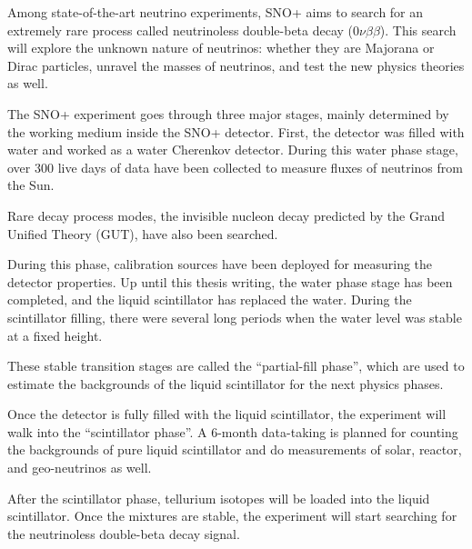 
Among state-of-the-art neutrino experiments, SNO+ aims to search for an extremely rare process called neutrinoless double-beta decay ($0\nu\beta\beta$). This search will explore the unknown nature of neutrinos: whether they are Majorana or Dirac particles, unravel the masses of neutrinos, and test the new physics theories as well.

The SNO+ experiment goes through three major stages, mainly determined by the working medium inside the SNO+ detector. First, the detector was filled with water and worked as a water Cherenkov detector. During this water phase stage, over 300 live days of data have been collected to measure fluxes of neutrinos from the Sun.

Rare decay process modes, the invisible nucleon decay predicted by the Grand Unified Theory (GUT), have also been searched. 

During this phase, calibration sources have been deployed for measuring the detector properties. Up until this thesis writing, the water phase stage has been completed, and the liquid scintillator has replaced the water. During the scintillator filling, there were several long periods when the water level was stable at a fixed height. 

These stable transition stages are called the ``partial-fill phase'', which are used to estimate the backgrounds of the liquid scintillator for the next physics phases.

Once the detector is fully filled with the liquid scintillator, the experiment will walk into the ``scintillator phase''. A 6-month data-taking is planned for counting the backgrounds of pure liquid scintillator and do measurements of solar, reactor, and geo-neutrinos as well\cite{directorReview}. 

After the scintillator phase, tellurium isotopes will be loaded into the liquid scintillator. Once the mixtures are stable, the experiment will start searching for the neutrinoless double-beta decay signal.

